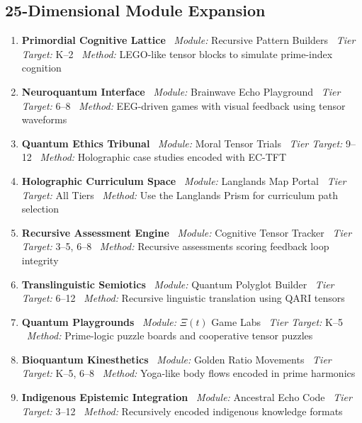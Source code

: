 \documentclass{article}
\theoremstyle{plain}
\theoremstyle{claimstyle}
\begin{document}
\subsection*{25-Dimensional Module Expansion}
\begin{enumerate}[leftmargin=*]
\item \textbf{Primordial Cognitive Lattice} \ \textit{Module:} Recursive Pattern Builders \ \textit{Tier Target:} K--2 \ \textit{Method:} LEGO-like tensor blocks to simulate prime-index cognition

\item \textbf{Neuroquantum Interface} \ \textit{Module:} Brainwave Echo Playground \ \textit{Tier Target:} 6--8 \ \textit{Method:} EEG-driven games with visual feedback using tensor waveforms

\item \textbf{Quantum Ethics Tribunal} \ \textit{Module:} Moral Tensor Trials \ \textit{Tier Target:} 9--12 \ \textit{Method:} Holographic case studies encoded with EC-TFT

\item \textbf{Holographic Curriculum Space} \ \textit{Module:} Langlands Map Portal \ \textit{Tier Target:} All Tiers \ \textit{Method:} Use the Langlands Prism for curriculum path selection

\item \textbf{Recursive Assessment Engine} \ \textit{Module:} Cognitive Tensor Tracker \ \textit{Tier Target:} 3--5, 6--8 \ \textit{Method:} Recursive assessments scoring feedback loop integrity

\item \textbf{Translinguistic Semiotics} \ \textit{Module:} Quantum Polyglot Builder \ \textit{Tier Target:} 6--12 \ \textit{Method:} Recursive linguistic translation using QARI tensors

\item \textbf{Quantum Playgrounds} \ \textit{Module:} $\Xi(t)$ Game Labs \ \textit{Tier Target:} K--5 \ \textit{Method:} Prime-logic puzzle boards and cooperative tensor puzzles

\item \textbf{Bioquantum Kinesthetics} \ \textit{Module:} Golden Ratio Movements \ \textit{Tier Target:} K--5, 6--8 \ \textit{Method:} Yoga-like body flows encoded in prime harmonics

\item \textbf{Indigenous Epistemic Integration} \ \textit{Module:} Ancestral Echo Code \ \textit{Tier Target:} 3--12 \ \textit{Method:} Recursively encoded indigenous knowledge formats


\end{enumerate}
\end{document}
